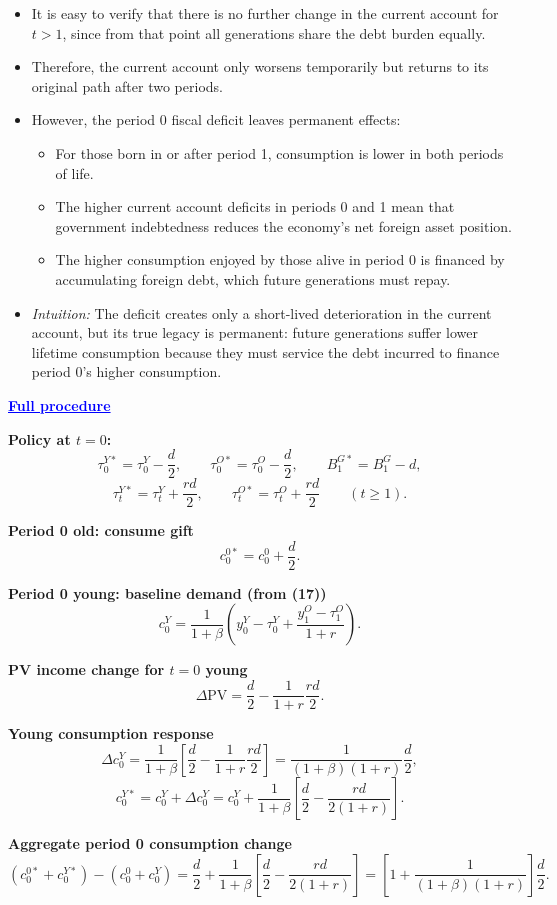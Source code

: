 \documentclass[12pt]{article}
\begin{document}
\begin{itemize}
  \item It is easy to verify that there is no further change in the current account for $t > 1$, since from that point all generations share the debt burden equally.

  \item Therefore, the current account only worsens temporarily but returns to its original path after two periods.

  \item However, the period 0 fiscal deficit leaves permanent effects:

  \begin{itemize}
    \item For those born in or after period 1, consumption is lower in both periods of life.
    \item The higher current account deficits in periods 0 and 1 mean that government indebtedness reduces the economy’s net foreign asset position.
    \item The higher consumption enjoyed by those alive in period 0 is financed by accumulating foreign debt, which future generations must repay.
  \end{itemize}

  \item \textit{Intuition:} The deficit creates only a short-lived deterioration in the current account, but its true legacy is permanent: future generations suffer lower lifetime consumption because they must service the debt incurred to finance period 0’s higher consumption.
\end{itemize}

\textcolor{blue}{\textbf{\uline{Full procedure}}}

{\color{blue}
\textbf{Policy at $t=0$:}
\[
\tau_0^{Y*}=\tau_0^{Y}-\frac{d}{2},\qquad 
\tau_0^{O*}=\tau_0^{O}-\frac{d}{2},\qquad 
B_1^{G*}=B_1^{G}-d,
\]
\[
\tau_t^{Y*}=\tau_t^{Y}+\frac{rd}{2},\qquad 
\tau_t^{O*}=\tau_t^{O}+\frac{rd}{2}\qquad (t\ge 1).
\]

\textbf{Period 0 old: consume gift}
\[
c_0^{0*}=c_0^{0}+\frac{d}{2}. \tag{25}
\]

\textbf{Period 0 young: baseline demand (from (17))}
\[
c_0^{Y}=\frac{1}{1+\beta}\!\left(y_0^{Y}-\tau_0^{Y}+\frac{y_1^{O}-\tau_1^{O}}{1+r}\right).
\]

\textbf{PV income change for $t=0$ young}
\[
\Delta \text{PV}=\frac{d}{2}-\frac{1}{1+r}\frac{rd}{2}.
\]

\textbf{Young consumption response}
\[
\Delta c_0^{Y}=\frac{1}{1+\beta}\left[\frac{d}{2}-\frac{1}{1+r}\frac{rd}{2}\right]
=\frac{1}{(1+\beta)(1+r)}\frac{d}{2},
\]
\[
c_0^{Y*}=c_0^{Y}+\Delta c_0^{Y}
=c_0^{Y}+\frac{1}{1+\beta}\left[\frac{d}{2}-\frac{rd}{2(1+r)}\right]. \tag{26}
\]

\textbf{Aggregate period 0 consumption change}
\[
(c_0^{0*}+c_0^{Y*})-(c_0^{0}+c_0^{Y})
=\frac{d}{2}+\frac{1}{1+\beta}\left[\frac{d}{2}-\frac{rd}{2(1+r)}\right]
=\boxed{\left[1+\frac{1}{(1+\beta)(1+r)}\right]\frac{d}{2}}.
\]
}
\end{document}
